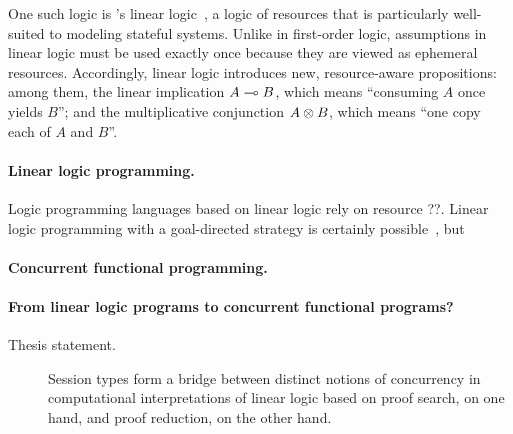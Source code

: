 One such logic is \citeauthor{Girard:TCS87}'s linear logic~\autocite*{Girard:TCS87}, a logic of resources that is particularly well-suited to modeling stateful systems.
Unlike in first-order logic, assumptions in linear logic must be used exactly once because they are viewed as ephemeral resources.
Accordingly, linear logic introduces new, resource-aware propositions: among them, the linear implication $A \multimap B$, which means \enquote{consuming $A$ once yields $B$}; and the multiplicative conjunction $A \otimes B$, which means \enquote{one copy each of $A$ and $B$}.

\paragraph*{Linear logic programming.}
Logic programming languages based on linear logic rely on resource {??}.
Linear logic programming with a goal-directed strategy is certainly possible~\autocite[for example]{Hodas+Miller:IC94}, but 

\paragraph*{Concurrent functional programming.}


\paragraph*{From linear logic programs to concurrent functional programs?}

\begin{description}
\item[Thesis statement.]
  Session types form a bridge between distinct notions of concurrency in computational interpretations of linear logic based on proof search, on one hand, and proof reduction, on the other hand.
\end{description}

\clearpage






